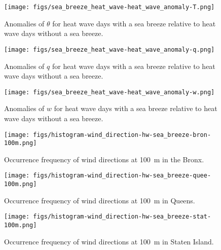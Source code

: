 \documentclass[num-refs]{wiley-article}
\begin{document}
\begin{figure}[ht]
	\centering
	\texttt{[image: figs/sea\_breeze\_heat\_wave-heat\_wave\_anomaly-T.png]}
	\caption{Anomalies of $\theta$ for heat wave days with a sea breeze relative to heat wave days without a sea breeze.}
	\label{fig:sea_breeze_heat_wave_anomaly-T}
\end{figure}
\begin{figure}[ht]
	\centering
	\texttt{[image: figs/sea\_breeze\_heat\_wave-heat\_wave\_anomaly-q.png]}
	\caption{Anomalies of $q$ for heat wave days with a sea breeze relative to heat wave days without a sea breeze.}
	\label{fig:sea_breeze_heat_wave_anomaly-q}
\end{figure}
\begin{figure}[ht]
	\centering
	\texttt{[image: figs/sea\_breeze\_heat\_wave-heat\_wave\_anomaly-w.png]}
	\caption{Anomalies of $w$ for heat wave days with a sea breeze relative to heat wave days without a sea breeze.}
	\label{fig:sea_breeze_heat_wave_anomaly-w}
\end{figure}


\begin{figure}[ht]
	\centering
	\texttt{[image: figs/histogram-wind\_direction-hw-sea\_breeze-bron-100m.png]}
	\caption{Occurrence frequency of wind directions at \SI{100}{\meter} in the Bronx.}
	\label{fig:wind_direction-heat_wave-sea_breeze-histogram-bron}
\end{figure}
\begin{figure}[ht]
	\centering
	\texttt{[image: figs/histogram-wind\_direction-hw-sea\_breeze-quee-100m.png]}
	\caption{Occurrence frequency of wind directions at \SI{100}{\meter} in Queens.}
	\label{fig:wind_direction-heat_wave-sea_breeze-histogram-quee}
\end{figure}
\begin{figure}[ht]
	\centering
	\texttt{[image: figs/histogram-wind\_direction-hw-sea\_breeze-stat-100m.png]}
	\caption{Occurrence frequency of wind directions at \SI{100}{\meter} in Staten Island.}
	\label{fig:wind_direction-heat_wave-sea_breeze-histogram-stat}
\end{figure}
\end{document}
